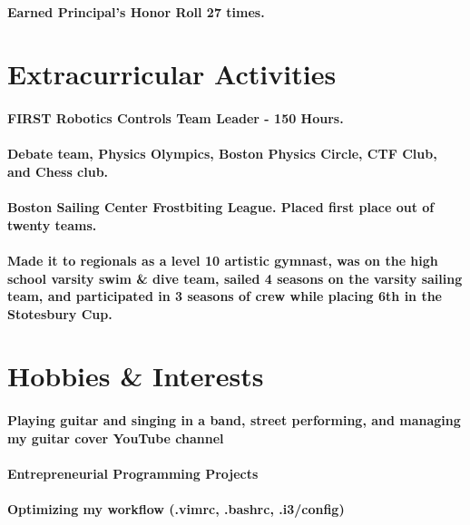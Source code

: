 \documentclass{article}
\begin{document}
\paragraph{Earned Principal's Honor Roll 27 times.}

\section{Extracurricular Activities}

\paragraph{FIRST Robotics Controls Team Leader - 150 Hours.}

\paragraph{Debate team, Physics Olympics, Boston Physics Circle, CTF Club, and Chess club.}
\paragraph{Boston Sailing Center Frostbiting League. Placed first place out of twenty teams.}
\paragraph{Made it to regionals as a level 10 artistic gymnast, was on the high school varsity swim \& dive team, sailed 4 seasons on the varsity sailing team, and participated in 3 seasons of crew while placing 6th in the Stotesbury Cup.}


\section{Hobbies \& Interests}

\paragraph{Playing guitar and singing in a band, street performing, and managing my guitar cover YouTube channel}

\paragraph{Entrepreneurial Programming Projects}

\paragraph{Optimizing my workflow (.vimrc, .bashrc, .i3/config)}
\end{document}
